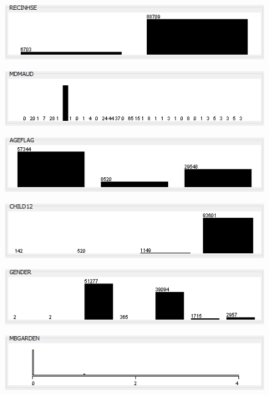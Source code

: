 \begin{figure}
\includegraphics{./images/expl_rep/Cattura-01-02}
\end{figure}
\begin{figure}
\includegraphics{./images/expl_rep/Cattura-01-03}
\end{figure}
\begin{figure}
\includegraphics{./images/expl_rep/Cattura-01-04}
\end{figure}
\begin{figure}
\includegraphics{./images/expl_rep/Cattura-01-05}
\end{figure}
\begin{figure}
\includegraphics{./images/expl_rep/Cattura-01-06}
\end{figure}
\begin{figure}
\includegraphics{./images/expl_rep/Cattura-01-07}
\end{figure}

